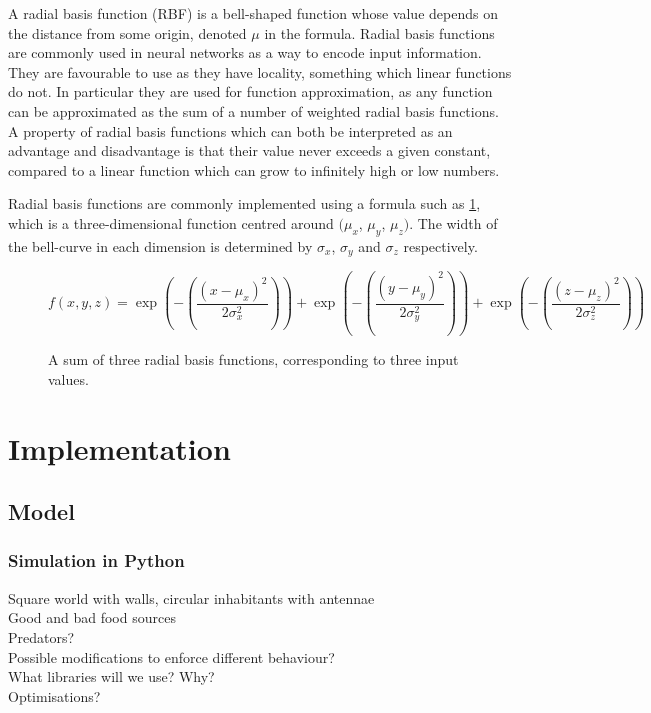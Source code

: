 \documentclass[a4paper,11pt]{kth-mag}
\begin{document}
A radial basis function (RBF) is a bell-shaped function whose value depends on the distance from some origin, denoted $\mu$ in the formula.  Radial basis functions are commonly used in neural networks as a way to encode input information. They are favourable to use as they have locality, something which linear functions do not. In particular they are used for function approximation, as any function can be approximated as the sum of a number of weighted radial basis functions. A property of radial basis functions which can both be interpreted as an advantage and disadvantage is that their value never exceeds a given constant, compared to a linear function which can grow to infinitely high or low numbers.

Radial basis functions are commonly implemented using a formula such as \ref{RBF_1}, which is a three-dimensional function centred around $(\mu _{x}$, $\mu _{y}$, $\mu _{z})$. The width of the bell-curve in each dimension is determined by $\sigma _{x}$, $\sigma _{y}$ and $\sigma _{z}$ respectively.

\begin{figure}
\begin{equation}
f(x,y,z) = \exp(-(\frac{(x-\mu_{x})^{2}}{2 \sigma _{x}^{2}})) + \exp(-(\frac{(y-\mu_{y})^{2}}{2 \sigma _{y}^{2}})) + \exp(-(\frac{(z-\mu_{z})^{2}}{2 \sigma _{z}^{2}}))
\end{equation}
\caption{A sum of three radial basis functions, corresponding to three input values.\label{RBF_1}}
\end{figure}

\chapter{Implementation}
\section{Model}
\subsection{Simulation in Python}
Square world with walls, circular inhabitants with antennae\\
Good and bad food sources\\
Predators?\\
Possible modifications to enforce different behaviour?\\
What libraries will we use? Why?\\
Optimisations?\\
\end{document}
